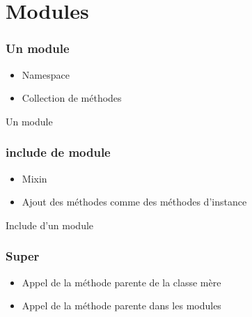 \documentclass{beamer}
\begin{document}
\section{Modules}

\begin{frame}
  \frametitle{Un module}
  \begin{itemize}
    \item Namespace
    \item Collection de m\'ethodes
  \end{itemize}
\end{frame}

\begin{frame}
  \begin{beamerboxesrounded}{Un module}
    
  \end{beamerboxesrounded}
\end{frame}

\begin{frame}
  \frametitle{include de module}
  \begin{itemize}
    \item Mixin
    \item Ajout des m\'ethodes comme des m\'ethodes d'instance
  \end{itemize}
\end{frame}

\begin{frame}
  \begin{beamerboxesrounded}{Include d'un module}
    
  \end{beamerboxesrounded}
\end{frame}

\begin{frame}
  \frametitle{Super}
  \begin{itemize}
    \item Appel de la m\'ethode parente de la classe mère
    \item Appel de la m\'ethode parente dans les modules
  \end{itemize}
\end{frame}
\end{document}
